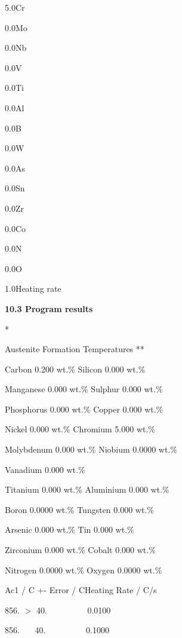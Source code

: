 \item {5.0}\indent	Cr
\item {0.0}\indent	Mo
\item {0.0}\indent	Nb
\item {0.0}\indent	V
\item {0.0}\indent	Ti
\item {0.0}\indent     Al
\item {0.0}\indent   B
\item {0.0}\indent     W
\item {0.0}\indent	As
\item {0.0}\indent	Sn
\item {0.0}\indent	Zr
\item {0.0}\indent	Co
\item {0.0}\indent	N
\item {0.0}\indent	O
\item {1.0}\indent	Heating rate
\item {} {\bf 10.3 Program results}
\bigskip
\centerline       **      Austenite Formation Temperatures    **           
\medskip
\parindent=2.0in
\item{Carbon     0.200  wt.\%} Silicon           0.000  wt.\%
\item{Manganese    0.000  wt.\%} Sulphur            0.000 wt.\%
\item{Phosphorus   0.000  wt.\%} Copper             0.000  wt.\%
\item{Nickel       0.000  wt.\%} Chromium           5.000  wt.\%
\item{Molybdenum   0.000  wt.\%} Niobium            0.0000 wt.\%   
\item{Vanadium     0.000  wt.\%}
\item{Titanium     0.000  wt.\%} Aluminium          0.000  wt.\%
\item{Boron        0.0000 wt.\%} Tungsten           0.000  wt.\%
\item{Arsenic      0.000  wt.\%} Tin                0.000  wt.\%
\item{Zirconium    0.000  wt.\%} Cobalt             0.000  wt.\%
\item{Nitrogen     0.0000 wt.\%} Oxygen             0.0000 wt.\%   
\bigskip
\dvd
\parindent=1.5in
\item{         Ac1 / C}       +- Error / C\indent Heating Rate / C/s
\item{            856.}        $>$ 40.    \indent~~~~~~~~~0.0100
\item{            856.}         ~~~40.    \indent~~~~~~~~~0.1000
